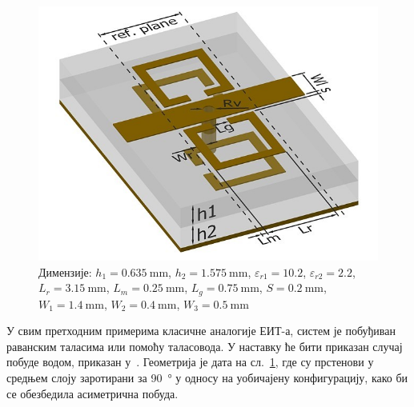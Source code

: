 \documentclass[main.tex]{subfiles}
\begin{document}
\begin{figure}[h]
    \centering
    \includegraphics[width=0.8\linewidth]{sl_eit/jc2.jpg}
    \caption{Димензије: $h_1=\SI{0.635}{\milli\meter}$, $h_2=\SI{1.575}{\milli\meter}$, $\varepsilon_{r1}=\num{10.2}$, $\varepsilon_{r2}=\num{2.2}$, $L_r=\SI{3.15}{\milli\meter}$, $L_m=\SI{0.25}{\milli\meter}$, $L_g=\SI{0.75}{\milli\meter}$, $S=\SI{0.2}{\milli\meter}$, $W_1=\SI{1.4}{\milli\meter}$, $W_2=\SI{0.4}{\milli\meter}$, $W_3=\SI{0.5}{\milli\meter}$}
    \label{fig:sl_eit/jc2}
\end{figure}
У свим претходним примерима класичне аналогије ЕИТ-а, систем је побуђиван раванским таласима или помоћу таласовода. У наставку ће бити приказан случај побуде водом, приказан у~\cite{mr03:eit}. Геометрија је дата на сл.~\ref{fig:sl_eit/jc2}, где су прстенови у средњем слоју заротирани за \SI{90}{\degree} у односу на уобичајену конфигурацију, како би се обезбедила асиметрична побуда.
\end{document}

